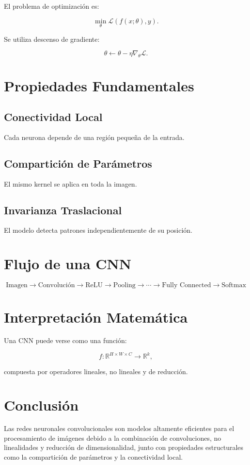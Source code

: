 \documentclass[
  letterpaper,
  DIV=11,
  numbers=noendperiod]{scrartcl}
\begin{document}
El problema de optimización es:

\[
\min_{\theta} \mathcal{L}(f(x;\theta), y).
\]

Se utiliza descenso de gradiente:

\[
\theta \leftarrow \theta - \eta \nabla_{\theta} \mathcal{L}.
\]

\section{Propiedades Fundamentales}\label{propiedades-fundamentales}

\subsection{Conectividad Local}\label{conectividad-local}

Cada neurona depende de una región pequeña de la entrada.

\subsection{Compartición de
Parámetros}\label{comparticiuxf3n-de-paruxe1metros}

El mismo kernel se aplica en toda la imagen.

\subsection{Invarianza Traslacional}\label{invarianza-traslacional}

El modelo detecta patrones independientemente de su posición.

\section{Flujo de una CNN}\label{flujo-de-una-cnn}

\[
\text{Imagen} \rightarrow \text{Convolución} \rightarrow \text{ReLU} \rightarrow \text{Pooling} \rightarrow \cdots \rightarrow \text{Fully Connected} \rightarrow \text{Softmax}
\]

\section{Interpretación
Matemática}\label{interpretaciuxf3n-matemuxe1tica}

Una CNN puede verse como una función:

\[
f: \mathbb{R}^{H \times W \times C} \to \mathbb{R}^{k},
\]

compuesta por operadores lineales, no lineales y de reducción.

\section{Conclusión}\label{conclusiuxf3n}

Las redes neuronales convolucionales son modelos altamente eficientes
para el procesamiento de imágenes debido a la combinación de
convoluciones, no linealidades y reducción de dimensionalidad, junto con
propiedades estructurales como la compartición de parámetros y la
conectividad local.
\end{document}
